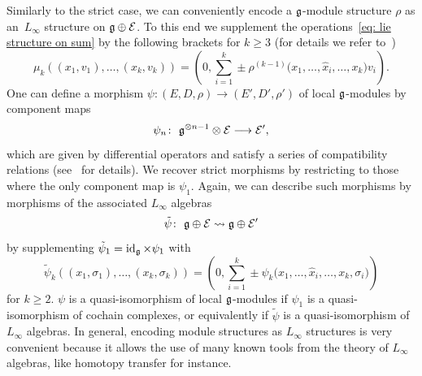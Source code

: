 \documentclass[pdftex]{sigma}
\numberwithin{equation}{section}
\def\cE{\mathcal E}\def\cF{\mathcal F}\def\cG{\mathcal G}\def\cH{\mathcal H}
\DeclareMathOperator{\id}{id}
\begin{document}
Similarly to the strict case, we can conveniently encode a $\mathfrak g$-module structure $\rho$ as an~$L_\infty$ structure on $\fg \oplus \cE$. To this end we supplement the operations~\eqref{eq: lie structure on sum} by the following brackets for $k\geq3$ (for details we refer to~\cite{Allocca, Lada})
\begin{equation*}
\mu_k((x_1,v_1),\dots,(x_k,v_k)) = \left( 0 , \sum_{i=1}^{k} \pm \rho^{(k-1)}\big(x_1,\dots,\hat{x}_i,\dots,x_k\big)v_i \right).
\end{equation*}
One can define a morphism $\psi \colon (E,D,\rho) \longrightarrow (E',D',\rho')$ of local $\mathfrak g$-modules by component maps
\begin{equation*}
\psi_n \colon \ \fg^{\otimes n-1} \otimes \cE \longrightarrow \cE' ,
\end{equation*}
which are given by differential operators and satisfy a series of compatibility relations (see~\cite{Allocca} for details). We recover strict morphisms by restricting to those where the only component map is $\psi_1$. Again, we can describe such morphisms by morphisms of the associated $L_\infty$ algebras
\begin{equation*}
\tilde{\psi} \colon \ \fg \oplus \cE \rightsquigarrow \fg \oplus \cE'
\end{equation*}
by supplementing $\tilde{\psi}_1 = \id_{\fg} \times \psi_1$ with
\begin{equation*}
\tilde{\psi}_k ((x_1,\sigma_1) , \dots , (x_k, \sigma_k)) = \left(0, \sum_{i=1}^{k} \pm \psi_k\big(x_1, \dots , \hat{x}_i , \dots , x_k , \sigma_i \big)\right)
\end{equation*}
for $k \geq 2$. $\psi$ is a quasi-isomorphism of local $\mathfrak g$-modules if $\psi_1$ is a quasi-isomorphism of cochain complexes, or equivalently if $\tilde{\psi}$ is a quasi-isomorphism of $L_\infty$ algebras. In general, encoding module structures as $L_\infty$ structures is very convenient because it allows the use of many known tools from the theory of $L_\infty$ algebras, like homotopy transfer for instance.
\end{document}
